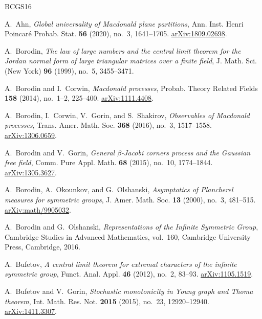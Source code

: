 \documentclass[11pt,reqno]{amsart}
\theoremstyle{definition}
\theoremstyle{remark}
\numberwithin{equation}{section}
\begin{document}
\begin{thebibliography}{BCGS16}

A.~Ahn,
\emph{Global universality of Macdonald plane partitions},
Ann. Inst. Henri Poincar\'e Probab. Stat. \textbf{56} (2020), no.~3, 1641--1705.
\href{https://arxiv.org/abs/1809.02698}{arXiv:1809.02698}.


A.~Borodin,
\emph{The law of large numbers and the central limit theorem for the Jordan
normal form of large triangular matrices over a finite field},
J. Math. Sci. (New York) \textbf{96} (1999), no.~5, 3455--3471.

A.~Borodin and I.~Corwin,
\emph{Macdonald processes},
Probab. Theory Related Fields \textbf{158} (2014), no.~1--2, 225--400.
\href{https://arxiv.org/abs/1111.4408}{arXiv:1111.4408}.

A.~Borodin, I.~Corwin, V.~Gorin, and S.~Shakirov,
\emph{Observables of Macdonald processes},
Trans. Amer. Math. Soc. \textbf{368} (2016), no.~3, 1517--1558.
\href{https://arxiv.org/abs/1306.0659}{arXiv:1306.0659}.

A.~Borodin and V.~Gorin,
\emph{General $\beta$-Jacobi corners process and the Gaussian free field},
Comm. Pure Appl. Math. \textbf{68} (2015), no.~10, 1774--1844.
\href{https://arxiv.org/abs/1305.3627}{arXiv:1305.3627}.

A.~Borodin, A.~Okounkov, and G.~Olshanski,
\emph{Asymptotics of Plancherel measures for symmetric groups},
J. Amer. Math. Soc. \textbf{13} (2000), no.~3, 481--515.
\href{https://arxiv.org/abs/math/9905032}{arXiv:math/9905032}.

A.~Borodin and G.~Olshanski,
\emph{Representations of the Infinite Symmetric Group},
Cambridge Studies in Advanced Mathematics, vol.~160,
Cambridge University Press, Cambridge, 2016.

A.~Bufetov,
\emph{A central limit theorem for extremal characters of the infinite
symmetric group},
Funct. Anal. Appl. \textbf{46} (2012), no.~2, 83--93.
\href{https://arxiv.org/abs/1105.1519}{arXiv:1105.1519}.

A.~Bufetov and V.~Gorin,
\emph{Stochastic monotonicity in Young graph and Thoma theorem},
Int. Math. Res. Not. \textbf{2015} (2015), no.~23, 12920--12940.
\href{https://arxiv.org/abs/1411.3307}{arXiv:1411.3307}.


\end{thebibliography}
\end{document}
